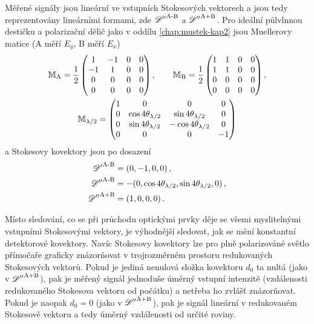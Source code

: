 Měřené signály jsou lineární ve vstupních Stokesových vektorech a jsou tedy reprezentovány lineárními formami, zde ${\mathscr{D}''}^\textrm{A-B}$ a ${\mathscr{D}''}^\textrm{A+B}$.
Pro ideální půlvlnnou destičku a polarizační dělič jako v oddílu \ref{chap:mustek-kap2} jsou Muellerovy matice (A měří $E_y$, B měří $E_x$)
\begin{subequations}
\begin{gather}
    \mathbb{M}_\textrm{A} = \frac{1}{2}\begin{pmatrix} 1&-1&0&0 \\ -1&1&0&0 \\ 0&0&0&0 \\ 0&0&0&0 \end{pmatrix} ,\qquad 
    \mathbb{M}_\textrm{B} = \frac{1}{2}\begin{pmatrix} 1&1&0&0 \\ 1&1&0&0 \\ 0&0&0&0 \\ 0&0&0&0 \end{pmatrix} , \\
    \mathbb{M}_{\lambda/2} = \begin{pmatrix} 1&0&0&0 \\ 0&\cos4\theta_{\lambda/2}&\sin4\theta_{\lambda/2}&0 \\ 0&\sin4\theta_{\lambda/2}&-\cos4\theta_{\lambda/2}&0 \\ 0&0&0&-1 \end{pmatrix}
\end{gather}
\end{subequations}
a Stokesovy kovektory jsou po dosazení
\begin{subequations}
\begin{align}
    {\mathscr{D}'}^\textrm{A-B} &=(0, -1, 0, 0) \,, \\
    {\mathscr{D}''}^\textrm{A-B} &=-(0, \cos4\theta_{\lambda/2}, \sin4\theta_{\lambda/2}, 0) \,, \label{eqn:Uab-Mueller} \\
    {\mathscr{D}''}^\textrm{A+B} &=(1, 0, 0, 0) \,.
\end{align}
\end{subequations}

Místo sledování, co se při průchodu optickými prvky děje se všemi myslitelnými vstupními Stokesovými vektory, je výhodnější sledovat, jak se mění konstantní detektorové kovektory.
Navíc Stokesovy kovektory lze pro plně polarizováné světlo přímočaře graficky znázorňovat v trojrozměrném prostoru redukovaných Stokesových vektorů.
Pokud je jediná nenulová složka kovektoru $d_0$ ta nultá (jako v ${\mathscr{D}''}^\textrm{A+B}$), pak je měřený signál jednoduše úměrný vstupní intenzitě (vzdálenosti redukovaného Stokesova vektoru od počátku) a netřeba ho zvlášť znázorňovat.
Pokud je naopak $d_0=0$ (jako v ${\mathscr{D}''}^\textrm{A+B}$), pak je signál lineární v redukovaném Stokesově vektoru a tedy úměrný vzdálenosti od určité roviny.

